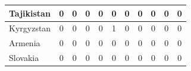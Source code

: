 \documentclass[12pt]{article}  %
\begin{document}
\begin{subappendices}
\begin{longtable}{|l|c|c|c|c|c|c|c|c|c|c|}
	\hline
	Tajikistan                                                     & 0                                                                      & 0                                                                      & 0                                                                      & 0                                                                      & 0                                                                      & 0                                                                      & 0                         & 0                           & 0                           & 0                           \\ 
	\hline
	Kyrgyzstan                                                     & 0                                                                      & 0                                                                      & 0                                                                      & 0                                                                      & 1                                                                      & 0                                                                      & 0                         & 0                           & 0                           & 0                           \\ 
	\hline
	Armenia                                                        & 0                                                                      & 0                                                                      & 0                                                                      & 0                                                                      & 0                                                                      & 0                                                                      & 0                         & 0                           & 0                           & 0                           \\ 
	\hline
	Slovakia                                                       & 0                                                                      & 0                                                                      & 0                                                                      & 0                                                                      & 0                                                                      & 0                                                                      & 0                         & 0                           & 0                           & 0                           \\ 

\end{longtable}
\end{subappendices}
\end{document}
